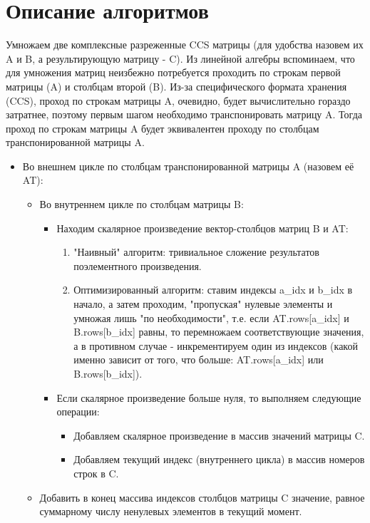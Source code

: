 \documentclass{report}
\begin{document}
	\section*{Описание алгоритмов}
		\par Умножаем две комплексные разреженные CCS матрицы (для удобства назовем их A и B, а результирующую матрицу - C). Из линейной алгебры вспоминаем, что для умножения матриц неизбежно потребуется проходить по строкам первой матрицы (A) и столбцам второй (B). Из-за специфического формата хранения (CCS), проход по строкам матрицы A, очевидно, будет вычислительно гораздо затратнее, поэтому первым шагом необходимо транспонировать матрицу A. Тогда проход по строкам матрицы A будет эквивалентен проходу по столбцам транспонированной матрицы A.
		\begin{itemize}
 			\item Во внешнем цикле по столбцам транспонированной матрицы A (назовем её AT):
			\begin{itemize}
				\item Во внутреннем цикле по столбцам матрицы B:
				\begin{itemize}
					\item Находим скалярное произведение вектор-столбцов матриц B и AT:
					\begin{enumerate}[label=\alph*.]
						\item "Наивный"{} алгоритм: тривиальное сложение результатов поэлементного произведения.
						\item Оптимизированный алгоритм: ставим индексы a\_idx и b\_idx в начало, а затем проходим, "пропуская"{} нулевые элементы и умножая лишь "по необходимости"{}, т.е. если AT.rows[a\_idx] и B.rows[b\_idx] равны, то перемножаем соответствующие значения, а в противном случае - инкрементируем один из индексов (какой именно зависит от того, что больше: AT.rows[a\_idx] или B.rows[b\_idx]).
					\end{enumerate}
					\item Если скалярное произведение больше нуля, то выполняем следующие операции:
					\begin{itemize}
						\item Добавляем скалярное произведение в массив значений матрицы C.
						\item Добавляем текущий индекс (внутреннего цикла) в массив номеров строк в C.
					\end{itemize}
				\end{itemize}
				\item Добавить в конец массива индексов столбцов матрицы C значение, равное суммарному числу ненулевых элементов в текущий момент.
			\end{itemize}
		\end{itemize}
	\newpage
\end{document}
